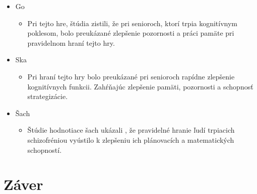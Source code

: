 \documentclass[10pt,oneside,slovak,a4paper]{article}
\begin{document}
\begin{itemize}
    \item Go
    	\begin{itemize}
        	\item {Pri tejto hre, štúdia \cite{Aydin:2015} zistili, že pri senioroch, ktorí trpia kognitívnym poklesom, bolo preukázané zlepšenie pozornosti a práci pamäte pri pravidelnom hraní tejto hry.}
    	\end{itemize}
    \item Ska
        \begin{itemize}
        	\item{Pri hraní tejto hry bolo preukázané \cite{Panphunpho:2013} pri senioroch rapídne zlepšenie kognitívnych funkcii. Zahŕňajúc zlepšenie pamäti, pozornosti a schopnosť strategizácie.}
    	\end{itemize}
    \item Šach
        \begin{itemize}
        	\item{Štúdie hodnotiace šach ukázali \cite{Sala:2015, Demily:2009}, že pravidelné hranie ľudí trpiacich schizofréniou vyústilo k zlepšeniu ich plánovacích a matematických schopností.}
    	\end{itemize}
\end{itemize}

\section{Záver} \label{zaver} %






\end{document}
